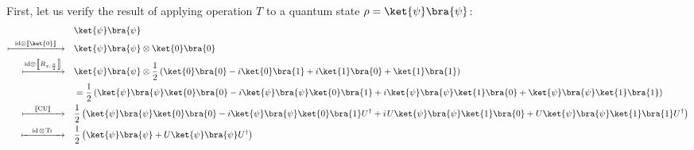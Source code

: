 \begin{example}
First, let us verify the result  of applying operation  $T$ to a quantum state $\rho=\ket{\psi}\bra{\psi}$:
\begin{equation*} \label{eq:operation_T}
  \begin{split}
  &\ket{\psi} \bra{\psi}\\
 \xmapsto{ \hspace{6pt}\id  \otimes \sem{\ket{0}} \hspace{6pt}} \quad & \ket{\psi} \bra{\psi} \otimes \ket{0} \bra{0} \\
  \xmapsto{ \id  \otimes \sem{R_{x,\frac{\pi}{2}}}} \quad  & \ket{\psi} \bra{\psi} \otimes \frac{1}{2} \left( \ket{0}\bra{0} -i \ket{0}\bra{1} + i \ket{1}\bra{0} + \ket{1}\bra{1} \right)  \\
  & = \frac{1}{2} \left( \ket{\psi} \bra{\psi}  \ket{0}\bra{0} -i \ket{\psi} \bra{\psi}\ket{0}\bra{1} + i \ket{\psi} \bra{\psi} \ket{1}\bra{0} + \ket{\psi} \bra{\psi}  \ket{1}\bra{1} \right) \\
  \xmapsto{\hspace{12pt} \sem{\text{CU}} \hspace{12pt}} \quad & \frac{1}{2} \left( \ket{\psi} \bra{\psi} \ket{0}\bra{0} - i\ket{\psi} \bra{\psi}\ket{0}\bra{1} U^{\dag} + i \hspace{1pt} U\ket{\psi} \bra{\psi} \ket{1}\bra{0} + U \ket{\psi} \bra{\psi}  \ket{1}\bra{1}U^{\dag} \right) \\ 
  \xmapsto{ \hspace{10pt} \id \hspace{1pt}\otimes \hspace{1pt} \tr \hspace{10pt} } \quad & \frac{1}{2} \left(\ket{\psi} \bra{\psi} + U\ket{\psi} \bra{\psi}U^{\dag} \right) \\
  \end{split} 
\end{equation*}


\end{example}
